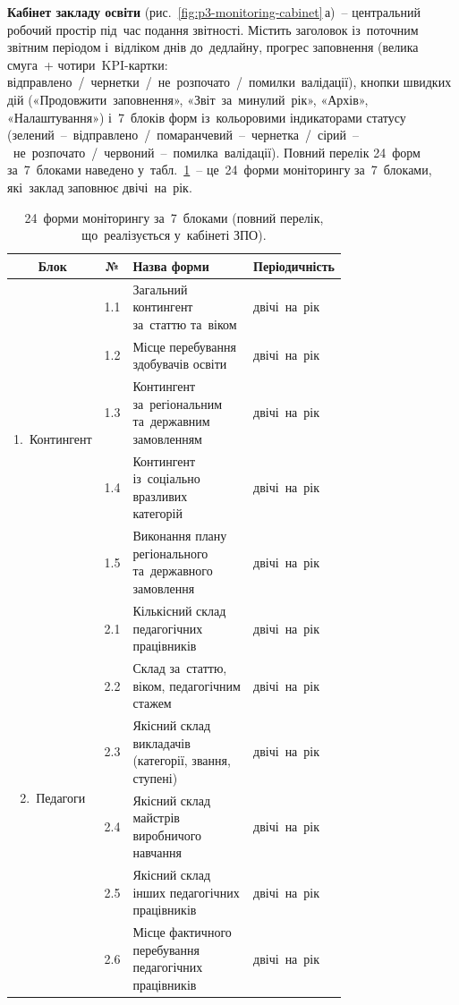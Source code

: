 \textbf{Кабінет закладу освіти} (рис.~\ref{fig:p3-monitoring-cabinet}\,а)~-- центральний робочий простір під~час подання звітності. Містить заголовок із~поточним звітним періодом і~відліком днів до~дедлайну, прогрес заповнення (велика смуга~+ чотири~KPI-картки: відправлено~/~чернетки~/~не~розпочато~/~помилки~валідації), кнопки швидких дій («Продовжити~заповнення», «Звіт~за~минулий~рік», «Архів», «Налаштування») і~7~блоків форм із~кольоровими індикаторами статусу (зелений~--~відправлено~/~помаранчевий~--~чернетка~/~сірий~--~не~розпочато~/~червоний~--~помилка~валідації). Повний перелік 24~форм за~7~блоками наведено у~табл.~\ref{tab:p3-forms}~-- це~24~форми моніторингу за~7~блоками, які~заклад заповнює двічі~на~рік.

\begin{table}[htbp]
\centering
\caption{24~форми моніторингу за~7~блоками (повний перелік, що~реалізується у~кабінеті ЗПО).}
\label{tab:p3-forms}
\scriptsize
\setlength\tabcolsep{2pt}
\renewcommand{\arraystretch}{0.95}
\begin{tabular}{|c|c|p{0.52\linewidth}|p{0.22\linewidth}|}
\hline
\textbf{Блок} & \textbf{№} & \textbf{Назва форми} & \textbf{Періодичність} \\
\hline
\multirow{5}{*}{1.~Контингент} & 1.1 & Загальний контингент за~статтю та~віком & двічі~на~рік \\
\cline{2-4}
 & 1.2 & Місце перебування здобувачів освіти & двічі~на~рік \\
\cline{2-4}
 & 1.3 & Контингент за~регіональним та~державним замовленням & двічі~на~рік \\
\cline{2-4}
 & 1.4 & Контингент із~соціально вразливих категорій & двічі~на~рік \\
\cline{2-4}
 & 1.5 & Виконання плану регіонального та~державного замовлення & двічі~на~рік \\
\hline
\multirow{8}{*}{2.~Педагоги} & 2.1 & Кількісний склад педагогічних працівників & двічі~на~рік \\
\cline{2-4}
 & 2.2 & Склад за~статтю, віком, педагогічним стажем & двічі~на~рік \\
\cline{2-4}
 & 2.3 & Якісний склад викладачів (категорії, звання, ступені) & двічі~на~рік \\
\cline{2-4}
 & 2.4 & Якісний склад майстрів виробничого навчання & двічі~на~рік \\
\cline{2-4}
 & 2.5 & Якісний склад інших педагогічних працівників & двічі~на~рік \\
\cline{2-4}
 & 2.6 & Місце фактичного перебування педагогічних працівників & двічі~на~рік \\

\end{tabular}
\end{table}
